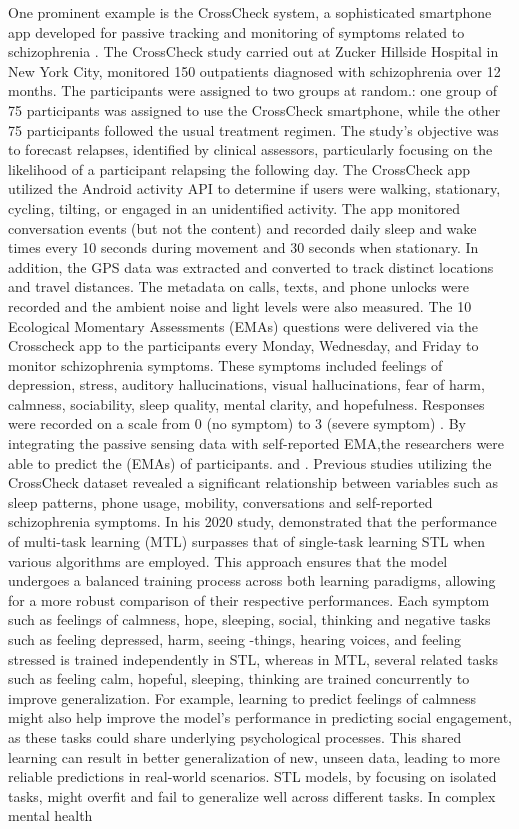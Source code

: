 One prominent example is the CrossCheck system, a sophisticated smartphone app developed for passive tracking and monitoring of symptoms related to schizophrenia \citep{adler2020predicting}. The CrossCheck study carried out at Zucker Hillside Hospital in New York City, monitored 150 outpatients diagnosed with schizophrenia over 12 months. The participants were assigned to two groups at random.: one group of 75 participants was assigned to use the CrossCheck smartphone, while the other 75 participants followed the usual treatment regimen. The study's objective was to forecast relapses, identified by clinical assessors, particularly focusing on the likelihood of a participant relapsing the following day.
The CrossCheck app utilized the Android activity API to determine if users were walking, stationary, cycling, tilting, or engaged in an unidentified activity. The app monitored conversation events (but not the content) and recorded daily sleep and wake times every 10 seconds during movement and 30 seconds when stationary. In addition, the GPS data was extracted and converted to track distinct locations and travel distances. The metadata on calls, texts, and phone unlocks were recorded and the ambient noise and light levels were also measured. The 10 Ecological Momentary Assessments (EMAs) questions were delivered via the Crosscheck app to the participants every Monday, Wednesday, and Friday to monitor schizophrenia symptoms. These symptoms included feelings of depression, stress, auditory hallucinations, visual hallucinations, fear of harm, calmness, sociability, sleep quality, mental clarity, and hopefulness. Responses were recorded on a scale from 0 (no symptom) to 3 (severe symptom) \citep{wang2016crosscheck}.  By integrating the passive sensing data with self-reported EMA,the researchers were able to predict the (EMAs) of participants. \citep{adler2020predicting} and \citep{wang2016crosscheck}. Previous studies utilizing the CrossCheck dataset revealed a significant relationship between variables such as sleep patterns, phone usage, mobility, conversations and self-reported schizophrenia symptoms. In his 2020 study, \citet{tseng2020using} demonstrated that the performance of multi-task learning (MTL) surpasses that of single-task learning STL when various algorithms are employed. This approach ensures that the model undergoes a balanced training process across both learning paradigms, allowing for a more robust comparison of their respective performances. Each symptom such as feelings of calmness, hope, sleeping, social, thinking and negative tasks such as feeling depressed, harm, seeing -things, hearing voices, and feeling stressed is trained independently in STL, whereas in MTL, several related tasks such as feeling calm, hopeful, sleeping, thinking are trained concurrently to improve generalization. For example, learning to predict feelings of calmness might also help improve the model's performance in predicting social engagement, as these tasks could share underlying psychological processes. This shared learning can result in better generalization of new, unseen data, leading to more reliable predictions in real-world scenarios. STL models, by focusing on isolated tasks, might overfit and fail to generalize well across different tasks. In complex mental health 